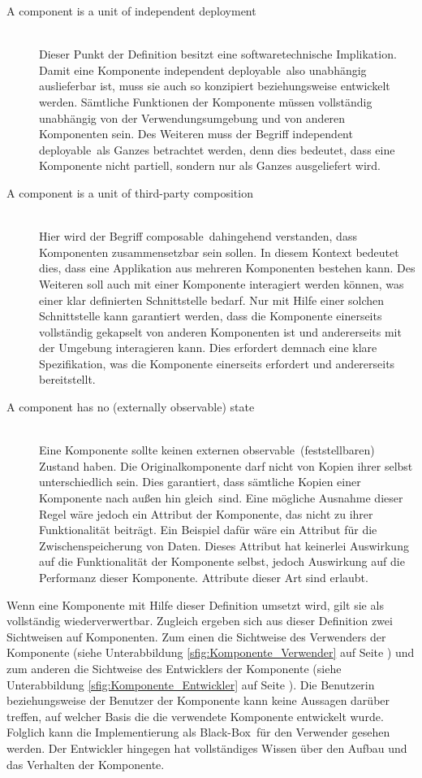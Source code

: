 \begin{description}
\item[A component is a unit of independent deployment] \hfill \\
Dieser Punkt der Definition besitzt eine softwaretechnische Implikation. Damit eine Komponente \glqq independent deployable\grqq\ also unabhängig auslieferbar ist, muss sie auch so konzipiert beziehungsweise entwickelt werden. Sämtliche Funktionen der Komponente müssen vollständig unabhängig von der Verwendungsumgebung und von anderen Komponenten sein. Des Weiteren muss der Begriff \glqq independent deployable\grqq\ als Ganzes betrachtet werden, denn dies bedeutet, dass eine Komponente nicht partiell, sondern nur als Ganzes ausgeliefert wird.
\item[A component is a unit of third-party composition] \hfill \\
Hier wird der Begriff \glqq composable\grqq\ dahingehend verstanden, dass Komponenten zusammensetzbar sein sollen. In diesem Kontext bedeutet dies, dass eine Applikation aus mehreren Komponenten bestehen kann. Des Weiteren soll auch mit einer Komponente interagiert werden können, was einer klar definierten Schnittstelle bedarf. Nur mit Hilfe einer solchen Schnittstelle kann garantiert werden, dass die Komponente einerseits vollständig gekapselt von anderen Komponenten ist und andererseits mit der Umgebung interagieren kann. Dies erfordert demnach eine klare Spezifikation, was die Komponente einerseits erfordert und andererseits bereitstellt.
\item[A component has no (externally observable) state] \hfill \\
Eine Komponente sollte keinen externen \glqq observable\grqq\ (feststellbaren) Zustand haben. Die Originalkomponente darf nicht von Kopien ihrer selbst unterschiedlich sein. Dies garantiert, dass sämtliche Kopien einer Komponente nach außen hin \glqq gleich\grqq\ sind.
Eine mögliche Ausnahme dieser Regel wäre jedoch ein Attribut der Komponente, das nicht zu ihrer Funktionalität beiträgt. Ein Beispiel dafür wäre ein Attribut für die Zwischenspeicherung von Daten. Dieses Attribut hat keinerlei Auswirkung auf die Funktionalität der Komponente selbst, jedoch Auswirkung auf die Performanz dieser Komponente. Attribute dieser Art sind erlaubt.
\end{description}

Wenn eine Komponente mit Hilfe dieser Definition umsetzt wird, gilt sie als vollständig wiederverwertbar.
Zugleich ergeben sich aus dieser Definition zwei Sichtweisen auf Komponenten. Zum einen die Sichtweise des Verwenders der Komponente (siehe Unterabbildung \ref{sfig:Komponente_Verwender} auf Seite \pageref{sfig:Komponente_Verwender}) und zum anderen die Sichtweise des Entwicklers der Komponente (siehe Unterabbildung \ref{sfig:Komponente_Entwickler} auf Seite \pageref{sfig:Komponente_Entwickler}). Die Benutzerin beziehungsweise der Benutzer der Komponente kann keine Aussagen darüber treffen, auf welcher Basis die die verwendete Komponente entwickelt wurde. Folglich kann die Implementierung als \glqq Black-Box\grqq\ für den Verwender gesehen werden. Der Entwickler hingegen hat vollständiges Wissen über den Aufbau und das Verhalten der Komponente.

